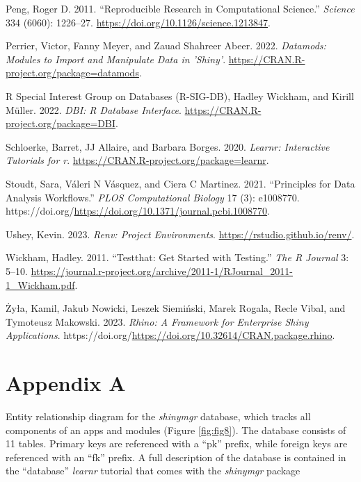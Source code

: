 \begin{CSLReferences}{1}{0}
\leavevmode{}%
Peng, Roger D. 2011. {``Reproducible Research in Computational Science.''} \emph{Science} 334 (6060): 1226--27. \url{https://doi.org/10.1126/science.1213847}.

\leavevmode{}%
Perrier, Victor, Fanny Meyer, and Zauad Shahreer Abeer. 2022. \emph{Datamods: Modules to Import and Manipulate Data in 'Shiny'}. \url{https://CRAN.R-project.org/package=datamods}.

\leavevmode{}%
R Special Interest Group on Databases (R-SIG-DB), Hadley Wickham, and Kirill Müller. 2022. \emph{DBI: R Database Interface}. \url{https://CRAN.R-project.org/package=DBI}.

\leavevmode{}%
Schloerke, Barret, JJ Allaire, and Barbara Borges. 2020. \emph{Learnr: Interactive Tutorials for r}. \url{https://CRAN.R-project.org/package=learnr}.

\leavevmode{}%
Stoudt, Sara, Váleri N Vásquez, and Ciera C Martinez. 2021. {``Principles for Data Analysis Workflows.''} \emph{PLOS Computational Biology} 17 (3): e1008770. https://doi.org/\url{https://doi.org/10.1371/journal.pcbi.1008770}.

\leavevmode{}%
Ushey, Kevin. 2023. \emph{Renv: Project Environments}. \url{https://rstudio.github.io/renv/}.

\leavevmode{}%
Wickham, Hadley. 2011. {``Testthat: Get Started with Testing.''} \emph{The R Journal} 3: 5--10. \url{https://journal.r-project.org/archive/2011-1/RJournal_2011-1_Wickham.pdf}.

\leavevmode{}%
Żyła, Kamil, Jakub Nowicki, Leszek Siemiński, Marek Rogala, Recle Vibal, and Tymoteusz Makowski. 2023. \emph{Rhino: A Framework for Enterprise Shiny Applications}. https://doi.org/\url{https://doi.org/10.32614/CRAN.package.rhino}.

\end{CSLReferences}

\newpage

\section{Appendix A}\label{appendix-a}

Entity relationship diagram for the \emph{shinymgr} database, which tracks all components of an apps and modules (Figure \ref{fig:fig8}). The database consists of 11 tables. Primary keys are referenced with a ``pk'' prefix, while foreign keys are referenced with an ``fk'' prefix. A full description of the database is contained in the ``database'' \emph{learnr} tutorial that comes with the \emph{shinymgr} package

